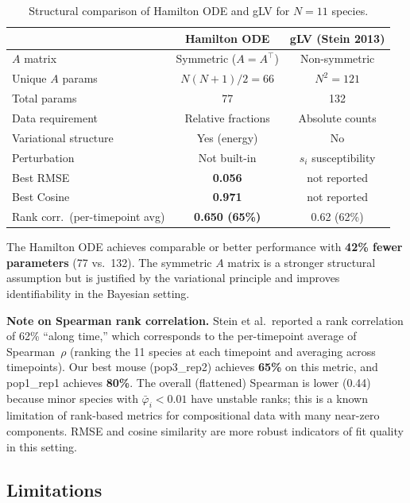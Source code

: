 \documentclass[11pt,a4paper]{article}
\begin{document}
\begin{table}[H]\centering\small
\caption{Structural comparison of Hamilton ODE and gLV for $N=11$ species.}
\begin{tabular}{lcc}
\toprule
& Hamilton ODE & gLV (Stein 2013) \\
\midrule
$A$ matrix & Symmetric ($A = A^\top$) & Non-symmetric \\
Unique $A$ params & $N(N+1)/2 = 66$ & $N^2 = 121$ \\
Total params & 77 & 132 \\
Data requirement & Relative fractions & Absolute counts \\
Variational structure & Yes (energy) & No \\
Perturbation & Not built-in & $s_i$ susceptibility \\
Best RMSE & \textbf{0.056} & not reported \\
Best Cosine & \textbf{0.971} & not reported \\
Rank corr.\ (per-timepoint avg) & \textbf{0.650 (65\%)} & 0.62 (62\%) \\
\bottomrule
\end{tabular}
\end{table}

The Hamilton ODE achieves comparable or better performance with
\textbf{42\% fewer parameters} (77 vs.\ 132). The symmetric $A$ matrix
is a stronger structural assumption but is justified by the variational
principle and improves identifiability in the Bayesian setting.

\textbf{Note on Spearman rank correlation.}
Stein et al.\ reported a rank correlation of 62\% ``along time,'' which
corresponds to the per-timepoint average of Spearman~$\rho$ (ranking the
11 species at each timepoint and averaging across timepoints).
Our best mouse (pop3\_rep2) achieves \textbf{65\%} on this metric, and
pop1\_rep1 achieves \textbf{80\%}. The overall (flattened) Spearman is
lower (0.44) because minor species with $\bar{\varphi}_i < 0.01$ have
unstable ranks; this is a known limitation of rank-based metrics for
compositional data with many near-zero components. RMSE and cosine
similarity are more robust indicators of fit quality in this setting.

\subsection{Limitations}
\end{document}
